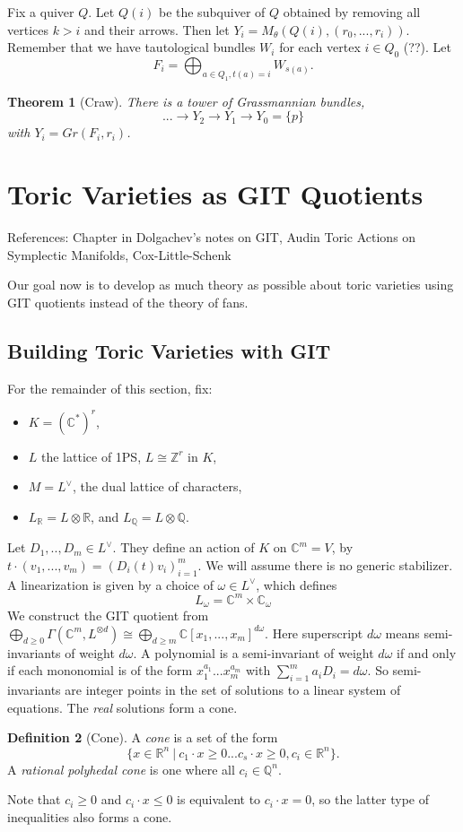 \documentclass{article}
\newtheorem{theorem}{Theorem}
\theoremstyle{definition}
\newtheorem{definition}[theorem]{Definition}
\theoremstyle{remark}
\numberwithin{theorem}{section}
\newcommand{\C}{\mathbb{C}}
\newenvironment{thm}{
\begin{mdframed}
	\vspace{-0.5em}
	\begin{theorem}
}{
	\end{theorem}
\end{mdframed}
}
\newenvironment{defn}{
	\begin{mdframed}
		\vspace{-0.5em}
		\begin{definition}
		}{
		\end{definition}
	\end{mdframed}
}
\begin{document}
	Fix a quiver $Q$. Let $Q(i)$ be the subquiver of $Q$ obtained by removing all vertices $k>i$ and their arrows. Then let $Y_i = M_\theta(Q(i), (r_0,...,r_i))$. Remember that we have tautological bundles $W_i$ for each vertex $i\in Q_0$ (??). Let 
	$$F_i = \bigoplus_{a\in Q_1, t(a)=i}W_{s(a)}.$$
	\begin{thm}[Craw]
		There is a tower of Grassmannian bundles,
		$$...\to Y_2\to Y_1\to Y_0=\{{p}\}$$
		with  $Y_i = Gr(F_i, r_i)$.
	\end{thm}

	\section{Toric Varieties as GIT Quotients}
	References: Chapter in Dolgachev's notes on GIT, Audin Toric Actions on Symplectic Manifolds, Cox-Little-Schenk \vspace{1em}
	
	Our goal now is to develop as much theory as possible about toric varieties using GIT quotients instead of the theory of fans.
	
	\subsection{Building Toric Varieties with GIT}
	For the remainder of this section, fix:
	\begin{itemize}
		\item $K = (\C^\ast)^r$,
		\item $L$ the lattice of 1PS, $L\cong \mathbb{Z}^r$ in $K$,
		\item $M=L^\vee$, the dual lattice of characters,
		\item $L_\mathbb{R} = L\otimes \mathbb{R}$, and $L_\mathbb{Q} = L\otimes \mathbb{Q}$.
	\end{itemize}
	Let $D_1,..,D_m \in L^\vee$. They define an action of $K$ on $\C^m=V$, by $t\cdot(v_1,...,v_m) = (D_i(t)v_i)_{i=1}^m$. We will assume there is no generic stabilizer. A linearization is given by a choice of $\omega \in L^\vee$, which defines
	$$L_\omega = \C^m\times \C_\omega$$
	We construct the GIT quotient from $\bigoplus_{d\geq 0}\Gamma(\C^m, L^{\otimes d}) \cong \bigoplus_{d\geq m} \C[x_1,...,x_m]^{d\omega}$. Here superscript $d\omega$ means semi-invariants of weight $d\omega$. A polynomial is a semi-invariant of weight $d\omega$ if and only if each mononomial is of the form $x_1^{a_1}...x_m^{a_m}$ with $\sum_{i=1}^m a_iD_i = d\omega$. So semi-invariants are integer points in the set of solutions to a linear system of equations. The \emph{real} solutions form a cone.
	\begin{defn}[Cone]
		A \emph{cone} is a set of the form
		$$\{x\in \mathbb{R}^n ~|~ c_1\cdot x \geq 0 ... c_s\cdot x \geq 0, c_i \in \mathbb{R}^n\}.$$ 
		A \emph{rational polyhedal cone} is one where all $c_i\in\mathbb{Q}^n$.
	\end{defn}
	Note that $c_i\geq 0$ and $c_i\cdot x \leq 0$ is equivalent to $c_i\cdot x =0$, so the latter type of inequalities also forms a cone. \vspace{1em}
	
\end{document}
